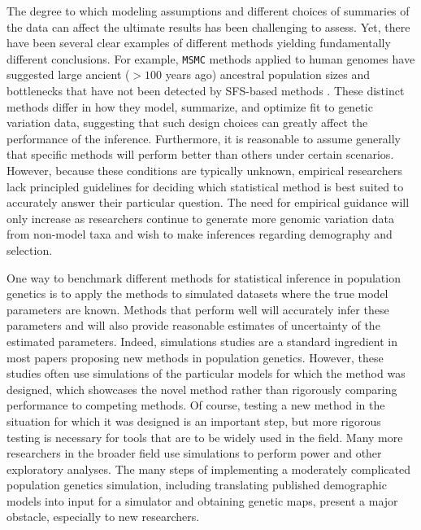 \documentclass[12pt,halfline,a4paper]{ouparticle}
\newcommand{\MSMC}{\texttt{MSMC}\xspace}
\begin{document}
The degree to which modeling assumptions and different choices of summaries of the
data can affect the ultimate results has been challenging to assess. Yet, there
have been several clear examples of different methods yielding fundamentally
different conclusions. For example, \MSMC methods applied to human genomes have
suggested large ancient ($>100$ years ago) ancestral population sizes and
bottlenecks that have not been detected by SFS-based methods
\citep[see][]{beichman2017comparison}.
These distinct methods differ in how they model, summarize, and optimize fit to
genetic variation data, suggesting that such design choices can greatly affect the
performance of the inference. Furthermore, it is reasonable
to assume generally that specific methods will perform better than others under certain scenarios.
However, because these conditions are typically unknown, empirical researchers
lack principled guidelines for deciding which statistical method is best suited
to accurately answer their particular question. The need for empirical
guidance will only increase as researchers continue to generate more genomic
variation data from non-model taxa and wish to make inferences regarding
demography and selection.

One way to benchmark different methods for statistical inference in population
genetics is to apply the methods to simulated datasets where the true model
parameters are known. Methods that perform well will accurately infer these
parameters and will also provide reasonable estimates of uncertainty of the
estimated parameters. Indeed, simulations studies are a standard ingredient in
most papers proposing new methods in population genetics. However, these
studies often use simulations of the particular models for which the method was designed,
which showcases the novel method rather than rigorously comparing performance to competing methods.
Of course, testing a new method in the situation for which it was designed is an important step,
but more rigorous testing is necessary for tools that are to be widely used in the field.
Many more researchers in the broader field
use simulations to perform power and other exploratory analyses.
The many steps of implementing a moderately complicated population genetics simulation,
including translating published demographic models into input for a simulator
and obtaining genetic maps,
present a major obstacle, especially to new researchers.
\end{document}
